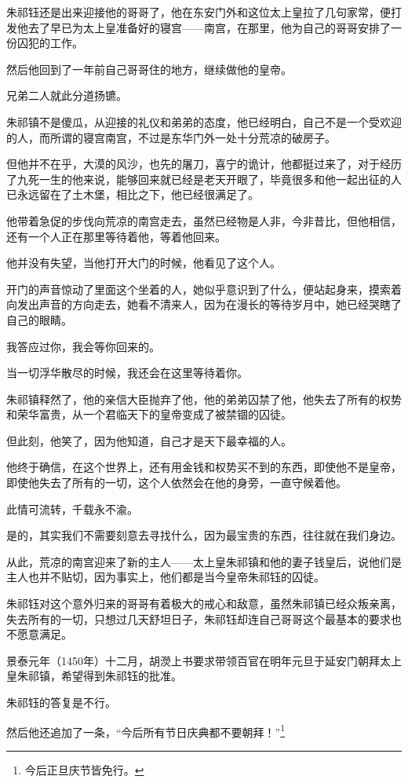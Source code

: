 \begin{multicols}{\theparacolNo}
朱祁钰还是出来迎接他的哥哥了，他在东安门外和这位太上皇拉了几句家常，便打发他去了早已为太上皇准备好的寝宫——南宫，在那里，他为自己的哥哥安排了一份囚犯的工作。

然后他回到了一年前自己哥哥住的地方，继续做他的皇帝。

兄弟二人就此分道扬镳。

朱祁镇不是傻瓜，从迎接的礼仪和弟弟的态度，他已经明白，自己不是一个受欢迎的人，而所谓的寝宫南宫，不过是东华门外一处十分荒凉的破房子。

但他并不在乎，大漠的风沙，也先的屠刀，喜宁的诡计，他都挺过来了，对于经历了九死一生的他来说，能够回来就已经是老天开眼了，毕竟很多和他一起出征的人已永远留在了土木堡，相比之下，他已经很满足了。

他带着急促的步伐向荒凉的南宫走去，虽然已经物是人非，今非昔比，但他相信，还有一个人正在那里等待着他，等着他回来。

他并没有失望，当他打开大门的时候，他看见了这个人。

开门的声音惊动了里面这个坐着的人，她似乎意识到了什么，便站起身来，摸索着向发出声音的方向走去，她看不清来人，因为在漫长的等待岁月中，她已经哭瞎了自己的眼睛。

我答应过你，我会等你回来的。

当一切浮华散尽的时候，我还会在这里等待着你。

朱祁镇释然了，他的亲信大臣抛弃了他，他的弟弟囚禁了他，他失去了所有的权势和荣华富贵，从一个君临天下的皇帝变成了被禁锢的囚徒。

但此刻，他笑了，因为他知道，自己才是天下最幸福的人。

他终于确信，在这个世界上，还有用金钱和权势买不到的东西，即使他不是皇帝，即使他失去了所有的一切，这个人依然会在他的身旁，一直守候着他。

此情可流转，千载永不渝。

是的，其实我们不需要刻意去寻找什么，因为最宝贵的东西，往往就在我们身边。

从此，荒凉的南宫迎来了新的主人——太上皇朱祁镇和他的妻子钱皇后，说他们是主人也并不贴切，因为事实上，他们都是当今皇帝朱祁钰的囚徒。

朱祁钰对这个意外归来的哥哥有着极大的戒心和敌意，虽然朱祁镇已经众叛亲离，失去所有的一切，只想过几天舒坦日子，朱祁钰却连自己哥哥这个最基本的要求也不愿意满足。

景泰元年（1450年）十二月，胡濙上书要求带领百官在明年元旦于延安门朝拜太上皇朱祁镇，希望得到朱祁钰的批准。

朱祁钰的答复是不行。

然后他还追加了一条，“今后所有节日庆典都不要朝拜！”\footnote{今后正旦庆节皆免行。}


\end{multicols}
